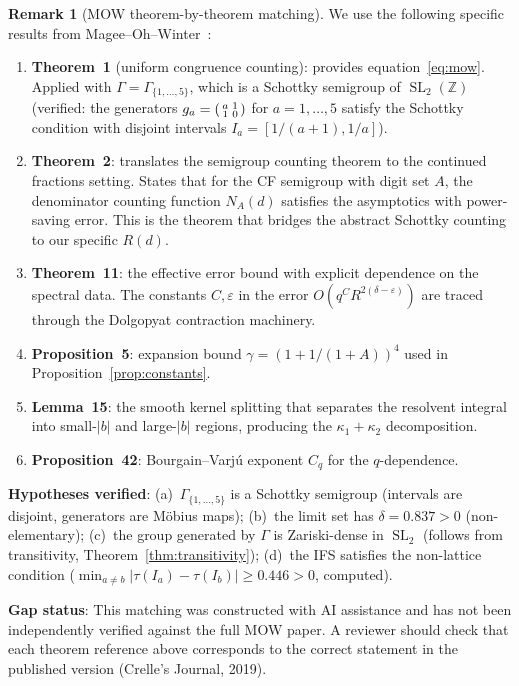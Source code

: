 \documentclass[11pt,a4paper]{amsart}
\theoremstyle{definition}
\newtheorem{remark}[theorem]{Remark}
\DeclareMathOperator{\SL}{SL}
\begin{document}
\begin{remark}[MOW theorem-by-theorem matching]\label{rem:mow-matching}
We use the following specific results from Magee--Oh--Winter~\cite{MOW2019}:
\begin{enumerate}
\item \textbf{Theorem~1} (uniform congruence counting): provides equation~\eqref{eq:mow}. Applied with $\Gamma = \Gamma_{\{1,\ldots,5\}}$, which is a Schottky semigroup of $\SL_2(\mathbb{Z})$ (verified: the generators $g_a = \begin{psmallmatrix} a & 1 \\ 1 & 0 \end{psmallmatrix}$ for $a = 1, \ldots, 5$ satisfy the Schottky condition with disjoint intervals $I_a = [1/(a+1), 1/a]$).
\item \textbf{Theorem~2}: translates the semigroup counting theorem to the continued fractions setting. States that for the CF semigroup with digit set $A$, the denominator counting function $N_A(d)$ satisfies the asymptotics with power-saving error. This is the theorem that bridges the abstract Schottky counting to our specific $R(d)$.
\item \textbf{Theorem~11}: the effective error bound with explicit dependence on the spectral data. The constants $C, \varepsilon$ in the error $O(q^C R^{2(\delta-\varepsilon)})$ are traced through the Dolgopyat contraction machinery.
\item \textbf{Proposition~5}: expansion bound $\gamma = (1 + 1/(1+A))^4$ used in Proposition~\ref{prop:constants}.
\item \textbf{Lemma~15}: the smooth kernel splitting that separates the resolvent integral into small-$|b|$ and large-$|b|$ regions, producing the $\kappa_1 + \kappa_2$ decomposition.
\item \textbf{Proposition~42}: Bourgain--Varj\'u exponent $C_q$ for the $q$-dependence.
\end{enumerate}
\textbf{Hypotheses verified}: (a)~$\Gamma_{\{1,\ldots,5\}}$ is a Schottky semigroup (intervals are disjoint, generators are M\"obius maps); (b)~the limit set has $\delta = 0.837 > 0$ (non-elementary); (c)~the group generated by $\Gamma$ is Zariski-dense in $\SL_2$ (follows from transitivity, Theorem~\ref{thm:transitivity}); (d)~the IFS satisfies the non-lattice condition ($\min_{a \neq b}|\tau(I_a) - \tau(I_b)| \geq 0.446 > 0$, computed).

\textbf{Gap status}: This matching was constructed with AI assistance and has not been independently verified against the full MOW paper. A reviewer should check that each theorem reference above corresponds to the correct statement in the published version (Crelle's Journal, 2019).
\end{remark}
\end{document}
